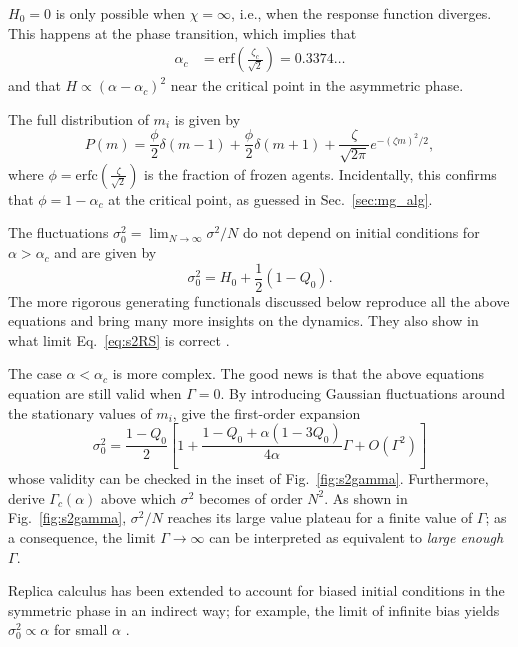 \documentclass[aps,twocolumn,nofootinbib,sortedaddress,reprint]{revtex4-1}
\begin{document}
$H_0=0$ is only possible when $\chi=\infty$, i.e., when the response
function diverges. This happens at the phase transition, which implies
that
\begin{align}
\alpha_c&=\textrm{erf}\left(\frac{\zeta_c}{\sqrt{2}}\right)=0.3374\dots
\end{align}
and that $H\propto (\alpha-\alpha_c)^2$ near the critical point in the
asymmetric phase.

The full distribution of $m_i$ is given by
\begin{equation}
P(m)=\frac{\phi}{2}\delta(m-1)+\frac{\phi}{2}\delta(m+1)+\frac{\zeta}{\sqrt{2\pi}}e^{-(\zeta
  m)^2/2},
\end{equation}
where $\phi=\textrm{erfc}\left(\frac{\zeta}{\sqrt{2}}\right)$ is the
fraction of frozen agents. Incidentally, this confirms that
$\phi=1-\alpha_c$ at the critical point, as guessed in Sec.~\ref{sec:mg_alg}.

The fluctuations $\sigma^2_0=\lim_{N\to\infty}\sigma^2/N$ do not
depend on initial conditions for $\alpha>\alpha_c$ and are given by
\begin{equation}\label{eq:s2RS}
\sigma^2_0=H_0+\frac{1}{2}(1-Q_0).
\end{equation}
The more rigorous generating functionals discussed below reproduce all
the above equations and bring many more insights on the
dynamics. They also show in what limit Eq.\ \eqref{eq:s2RS} is
correct \cite{CoolenOnline}.

The case $\alpha<\alpha_c$ is more complex. The good news is that the above equations
equation are still valid when $\Gamma=0$. By introducing Gaussian
fluctuations around the stationary values of $m_i$, \textcite{MC01}
give the first-order expansion
\begin{equation}
\label{eq:s2_gamma}
\sigma_0^
2=\frac{1-Q_0}{2}\left[1+\frac{1-Q_0+\alpha(1-3Q_0)}{4\alpha}\Gamma+O(\Gamma^2)\right]
\end{equation}
whose validity can be checked in the inset of
Fig.\ \ref{fig:s2gamma}. Furthermore, \textcite{MC00} derive
$\Gamma_c(\alpha)$ above which $\sigma^2$ becomes of order $N^2$. As
shown in Fig.\ \ref{fig:s2gamma}, $\sigma^2/N$ reaches its large value
plateau for a finite value of $\Gamma$; as a consequence, the limit
$\Gamma\to\infty$ can be interpreted as equivalent to {\em large
  enough} $\Gamma$.

Replica calculus has been extended to account for biased initial conditions in the
symmetric phase in an indirect way; for example, the limit of infinite
bias yields $\sigma^2_0\propto \alpha$ for small $\alpha$ \cite{MC01}.
\end{document}
